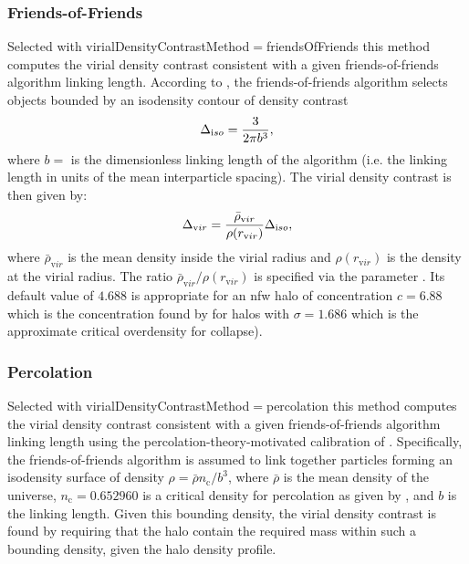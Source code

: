 \subsubsection{Friends-of-Friends}

Selected with {\normalfont \ttfamily virialDensityContrastMethod}$=${\normalfont \ttfamily friendsOfFriends} this method computes the virial density contrast consistent with a given friends-of-friends algorithm linking length. According to \cite{lacey_merger_1994}, the friends-of-friends algorithm selects objects bounded by an isodensity contour of density contrast
\begin{equation}
\Delta_{\mathrm iso} = {3 \over 2 \pi b^3},
\end{equation}
where $b=${\normalfont \ttfamily [virialDensityContrastFoFLinkingLength]} is the dimensionless linking length of the algorithm (i.e. the linking length in units of the mean interparticle spacing). The virial density contrast is then given by:
\begin{equation}
\Delta_{\mathrm vir} = {\bar{\rho}_{\mathrm vir} \over \rho(r_{\mathrm vir})} \Delta_{\mathrm iso},
\end{equation}
where $\bar{\rho}_{\mathrm vir}$ is the mean density inside the virial radius and $\rho(r_{\mathrm vir})$ is the density at the virial radius. The ratio $\bar{\rho}_{\mathrm vir} / \rho(r_{\mathrm vir})$ is specified via the parameter {\normalfont \ttfamily [virialDensityContrastFoFDensityRatio]}. Its default value of $4.688$ is appropriate for an \gls{nfw} halo of concentration $c=6.88$ which is the concentration found by \cite{prada_halo_2011} for halos with $\sigma=1.686$ which is the approximate critical overdensity for collapse).

\subsubsection{Percolation}

Selected with {\normalfont \ttfamily virialDensityContrastMethod}$=${\normalfont \ttfamily percolation} this method computes the virial density contrast consistent with a given friends-of-friends algorithm linking length using the percolation-theory-motivated calibration of \cite{more_overdensity_2011}. Specifically, the friends-of-friends algorithm is assumed to link together particles forming an isodensity surface of density $\rho = \bar{\rho} n_{\mathrm c}/b^3$, where $\bar{\rho}$ is the mean density of the universe, $n_{\mathrm c}=0.652960$ is a critical density for percolation as given by \cite{more_overdensity_2011}, and $b$ is the linking length. Given this bounding density, the virial density contrast is found by requiring that the halo contain the required mass within such a bounding density, given the halo density profile. 

